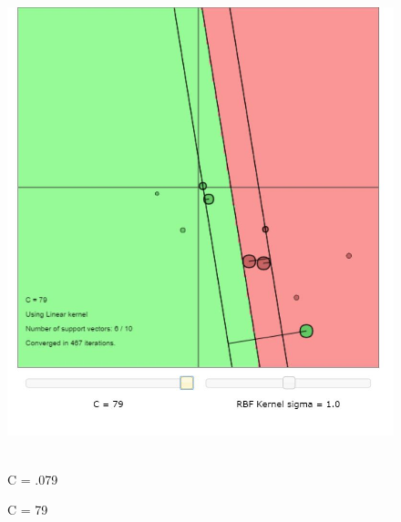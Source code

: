 \documentclass[11pt,oneside,a4paper]{article}
\begin{document}
\begin{figure}[h!]
{	}%
	\else
	\hbox{%
		\includegraphics[height=\ht0]{../Figures/large_C_linear_kernal}%
	}%
	\fi
	\noindent
	\parbox{.45\textwidth}{%
		\centering
		\caption{C = .079}
		\label{fg:methods}
	}%
	\hfil
	\parbox{.45\textwidth}{%
		\centering
		\caption{C = 79}
		\label{fg:method_detail}
	}%
\end{figure}

 
\end{document}
